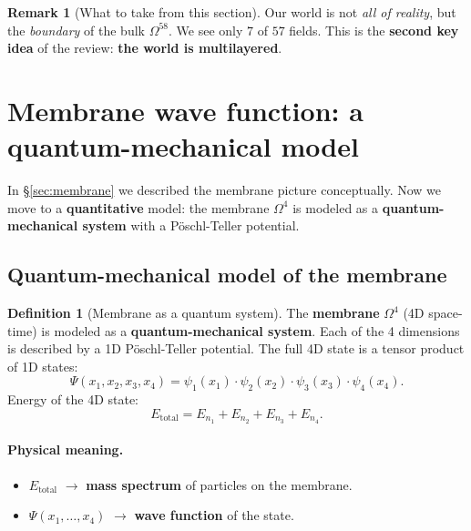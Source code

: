 \documentclass[11pt,a4paper]{article}
\newcommand{\Om}{\Omega^4}
\newcommand{\Omfi}{\Omega^{58}}
\theoremstyle{definition}
\newtheorem{definition}[theorem]{Definition}
\newtheorem{remark}[theorem]{Remark}
\begin{document}
\begin{remark}[What to take from this section]
\label{rem:membrane-takeaway}
Our world is not \emph{all of reality}, but the \emph{boundary} of the bulk $\Omfi$. 
We see only $7$ of $57$ fields. This is the \textbf{second key 
idea} of the review: \textbf{the world is multilayered}.
\end{remark}

\section{Membrane wave function: a quantum-mechanical model}
\label{sec:membrane-wave-review}

In §\ref{sec:membrane} we described the membrane picture conceptually. 
Now we move to a \textbf{quantitative} model: the membrane 
$\Om$ is modeled as a \textbf{quantum-mechanical system} 
with a Pöschl-Teller potential.

\subsection{Quantum-mechanical model of the membrane}

\begin{definition}[Membrane as a quantum system]
\label{def:membrane-quantum-review}
The \textbf{membrane} $\Om$ (4D space-time) is modeled 
as a \textbf{quantum-mechanical system}. Each of the 4 dimensions 
is described by a 1D Pöschl-Teller potential. The full 4D state is a 
tensor product of 1D states:
\begin{equation}
    \boxed{
    \Psi(x_1, x_2, x_3, x_4) = 
    \psi_1(x_1) \cdot \psi_2(x_2) \cdot \psi_3(x_3) \cdot \psi_4(x_4).
    }
    \label{eq:membrane-psi-review}
\end{equation}
Energy of the 4D state:
\begin{equation}
    \boxed{
    E_{\text{total}} = E_{n_1} + E_{n_2} + E_{n_3} + E_{n_4}.
    }
    \label{eq:membrane-E-review}
\end{equation}
\end{definition}

\paragraph{Physical meaning.}
\begin{itemize}
    \item $E_{\text{total}}$ $\to$ \textbf{mass spectrum} of particles 
          on the membrane.
    \item $\Psi(x_1, \ldots, x_4)$ $\to$ \textbf{wave function} 
          of the state.
\end{itemize}
\end{document}
